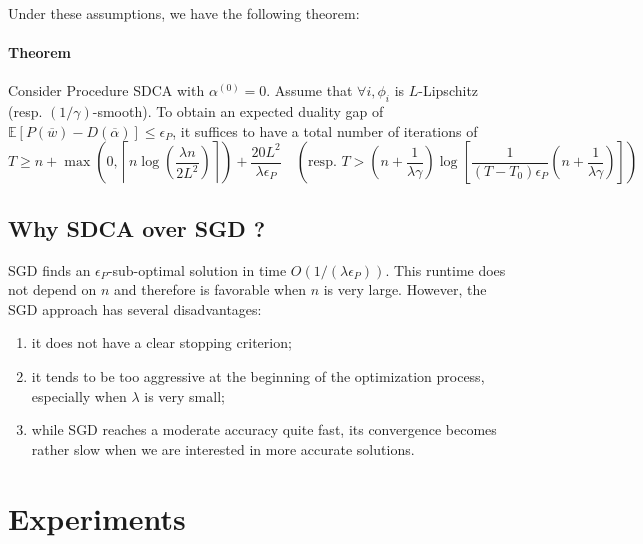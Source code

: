 \documentclass{article}
\begin{document}
Under these assumptions, we have the following theorem:

\paragraph{Theorem} Consider Procedure SDCA with $\alpha^{(0)} = 0$.
Assume that $\forall i, \phi_i$ is $L$-Lipschitz (resp.
$(1/\gamma)$-smooth).
To obtain an expected duality gap of $\mathbb{E}[P(\overline{w})-D(\overline{\alpha})] \leq \epsilon_P$, it suffices to have a total number of iterations of
\begin{equation}
	T \geq n + \max\left(0, \left\lceil n \log \left(\dfrac{\lambda n}{2 L^2} \right) \right\rceil \right) + \dfrac{20 L^2}{\lambda \epsilon_P} \quad \left( \text{resp. } T > \left(n + \dfrac{1}{\lambda \gamma} \right) \log \left[ \dfrac{1}{(T-T_0)\epsilon_P} \left(n + \dfrac{1}{\lambda \gamma} \right) \right] \right)
\end{equation}

\subsection{Why SDCA over SGD ?}

SGD finds an $\epsilon_P$-sub-optimal solution in time $O(1/(\lambda \epsilon_P))$.
This runtime does not depend on $n$ and therefore is favorable when $n$ is very large.
However, the SGD approach has several disadvantages:

\begin{enumerate}
    \item it does not have a clear stopping criterion;
    \item it tends to be too aggressive at the beginning of the optimization process, especially when $\lambda$ is very small;
    \item while SGD reaches a moderate accuracy quite fast, its convergence becomes rather slow when we are interested in more accurate solutions.
\end{enumerate}


\newpage
\section{Experiments}
\end{document}
